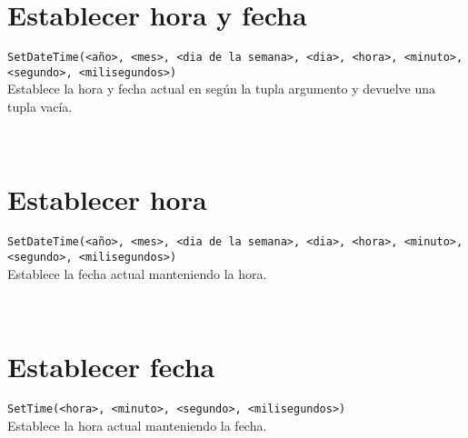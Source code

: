    \section{Establecer hora y fecha}
      \texttt{SetDateTime(<año>, <mes>, <dia de la semana>, <dia>, <hora>, <minuto>, <segundo>, <milisegundos>)}
      \\
      
      Establece la hora y fecha actual en según la tupla argumento y devuelve una tupla vacía.
      \\
      
      \begin{fxcode}
         \\
         \outcode{()}
      \end{fxcode}
      
   \section{Establecer hora}
      \texttt{SetDateTime(<año>, <mes>, <dia de la semana>, <dia>, <hora>, <minuto>, <segundo>, <milisegundos>)}
      \\
      
      Establece la fecha actual manteniendo la hora.
      \\
      
      \begin{fxcode}
         \\
         \outcode{()}
      \end{fxcode}
      
   \section{Establecer fecha}
      \texttt{SetTime(<hora>, <minuto>, <segundo>, <milisegundos>)}
      \\
      
      Establece la hora actual manteniendo la fecha.
      \\
      
      \begin{fxcode}
         \\
         \outcode{()}
      \end{fxcode}
      
   
   
   
   
   
   
   
   
   
